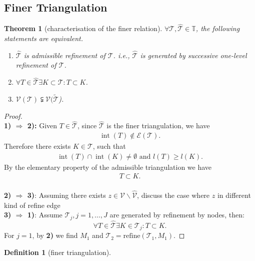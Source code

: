 \documentclass[a4paper,12pt,oneside,fleqn]{book}
\newtheorem{theorem}{Theorem}[section]
\theoremstyle{definition}
\newtheorem{definition}{Definition}[section]
\theoremstyle{remark}
\DeclareMathOperator*{\interior}{int}
\begin{document}
\subsection{Finer Triangulation}
\begin{theorem}[characterisation of the finer relation]
$\forall \mathcal{T}, \hat{\mathcal{T}} \in \mathbb{T}$, the following statements are equivalent.
\begin{enumerate}
	\item $\hat{\mathcal{T}}$ is admissible refinement of $\mathcal{T}$. i.e., $\hat{\mathcal{T}}$ is generated by successive one-level refinement of $\mathcal{T}$. 
	\item $\forall T \in \hat{\mathcal{T}} \exists K \subset \mathcal{T}: T \subset K$. 
	\item $\mathcal{V}(\mathcal{T}) \subsetneqq \mathcal{V}(\tilde{\mathcal{T}}$). 
\end{enumerate}
\end{theorem}
\begin{proof}\quad\\
\textbf{1) $\Rightarrow$ 2):} Given $T \in \hat{\mathcal{T}}$, since $\hat{\mathcal{T}}$ is the finer triangulation, we have
\begin{align*}
	\interior(T) \notin \mathcal{E}(\mathcal{T}). 
\end{align*}
Therefore there exists $K \in \mathcal{T}$, such that
\begin{align*}
	\interior(T) \cap \interior(K) \neq \emptyset \text{ and } l(T) \ge l(K).
\end{align*}
By the elementary property of the admissible triangulation we have
\begin{align*}
	T \subset K. 
\end{align*}
\quad\\
\textbf{2) $\Rightarrow$ 3)}: Assuming there exists $z \in \mathcal{V} \backslash \hat{\mathcal{V}}$, discuss the case where $z$ in different kind of refine edge 
\qquad\\
\textbf{3) $\Rightarrow$ 1)}: Assume $\mathcal{T}_j, j = 1, \dots, J$ are generated by refinement by nodes, then:
\begin{equation}
	\forall T \in \hat{\mathcal{T}} \exists K \in \mathcal{T}_j: T \subset K. 
\end{equation}
For $j = 1$, by \textbf{2)} we find $M_1$ and  $\mathcal{T}_2 = \text{refine}(\mathcal{T}_1, M_1)$. 
\end{proof}


\begin{definition}[finer triangulation]
		
\end{definition}
	
\end{document}
